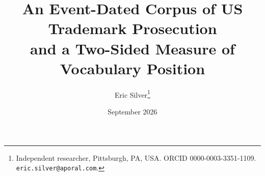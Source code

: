 
\newcommand{\onlineappendixnote}{\url{https://aporia.institute/tm-vocabulary/online-appendix/themes_T50.html}}
\graphicspath{{../../}}
\makeatletter{}\makeatother
\title{\bfseries An Event-Dated Corpus of US Trademark Prosecution\\
\large and a Two-Sided Measure of Vocabulary Position}
\author{Eric Silver\thanks{Independent researcher, Pittsburgh, PA, USA.
ORCID 0000-0003-3351-1109. \texttt{eric.silver@aporal.com}.}}
\date{September 2026}

\usepackage{placeins}

\maketitle









\FloatBarrier



